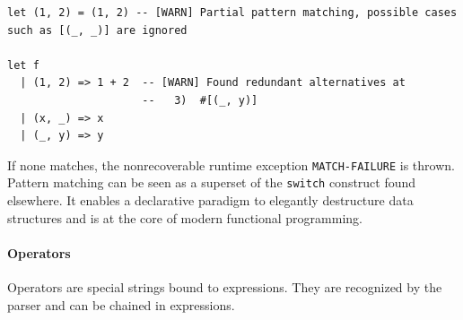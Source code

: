 \documentclass[a4paper, 11pt]{article}
\theoremstyle{remark}\newtheorem*{remark}{Remark}
\theoremstyle{definition}\newtheorem*{definition}{Definition}
\begin{document}
\begin{verbatim}
let (1, 2) = (1, 2) -- [WARN] Partial pattern matching, possible cases such as [(_, _)] are ignored

let f
  | (1, 2) => 1 + 2  -- [WARN] Found redundant alternatives at
                     --   3)  #[(_, y)]
  | (x, _) => x
  | (_, y) => y

\end{verbatim}
If none matches, the nonrecoverable runtime exception \texttt{MATCH-FAILURE} is thrown. Pattern
matching can be seen as a superset of the \texttt{switch} construct found elsewhere. It enables
a declarative paradigm to elegantly destructure data structures
and is at the core of modern functional programming.
\paragraph{Operators}
Operators are special strings bound to expressions. They are recognized by the parser and can be chained
in expressions.
\end{document}
